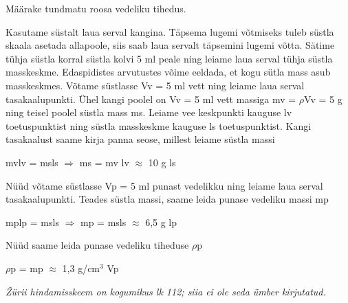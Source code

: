 
Määrake tundmatu roosa vedeliku tihedus.

\hint

\solu
Kasutame süstalt laua serval kangina. Täpsema lugemi võtmiseks tuleb süstla skaala asetada allapoole, siis saab laua servalt täpsemini lugemi võtta. Sätime tühja süstla korral süstla kolvi 5 ml peale ning leiame laua serval tühja süstla masskeskme. Edaspidistes arvutustes võime eeldada, et kogu sütla mass asub masskeskmes. Võtame süstlasse Vv = 5 ml vett ning leiame laua serval tasakaalupunkti. Ühel kangi poolel on Vv = 5 ml vett massiga mv = $\rho$Vv = 5 g ning teisel poolel süstla mass ms. Leiame vee keskpunkti kauguse lv toetuspunktist ning süstla masskeskme kauguse ls toetuspunktist. Kangi tasakaalust saame kirja panna seose, millest leiame süstla massi

mvlv = msls $\Rightarrow$ ms = mv lv $\approx$ 10 g ls

Nüüd võtame süstlasse Vp = 5 ml punast vedelikku ning leiame laua serval tasakaalupunkti. Teades süstla massi, saame leida punase vedeliku massi mp

mplp = msls $\Rightarrow$ mp = msls $\approx$ 6,5 g lp

Nüüd saame leida punase vedeliku tiheduse $\rho$p

$\rho$p = mp $\approx$ 1,3 g/cm$^3$ Vp

\textit{Žürii hindamisskeem on kogumikus lk 112; siia ei ole seda ümber kirjutatud.}
\probend
